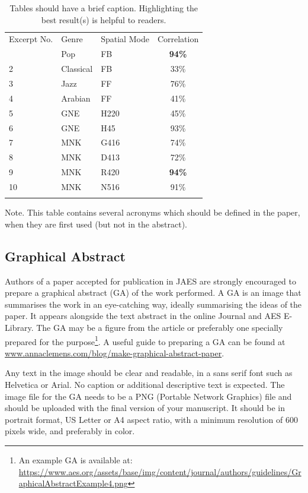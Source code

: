 \documentclass[fleqn]{jaes}
\begin{document}
\begin{table}[t]
\caption{Tables should have a brief caption. Highlighting the best result(s) is helpful to readers.}
\label{table:an_example_table}
{%
\begin{tabular}{@{}lllc@{}}\toprule
Excerpt No.& Genre & Spatial Mode & Correlation\\\colrule
 1 & Pop       & FB   & \textbf{94\%}\\
 2 & Classical & FB   & 33\%\\
 3 & Jazz      & FF   & 76\%\\
 4 & Arabian   & FF   & 41\%\\
 5 & GNE       & H220 & 45\%\\
 6 & GNE       & H45  & 93\%\\
 7 & MNK       & G416 & 74\%\\
 8 & MNK       & D413 & 72\%\\
 9 & MNK       & R420 & \textbf{94\%}\\
10 & MNK       & N516 & 91\%\\\botrule
\end{tabular}}
\begin{tabnote}
Note. This table contains several acronyms which should be defined in the paper, when they are first used (but not in the abstract).
\end{tabnote}
\end{table}

\subsection{Graphical Abstract}
Authors of a paper accepted for publication in JAES are strongly encouraged to prepare a graphical abstract (GA) of the work performed. A GA is an image that summarises the work in an eye-catching way, ideally summarising the ideas of the paper. It appears alongside the text abstract in the online Journal and AES E-Library. The GA may be a figure from the article or preferably one specially prepared for the purpose\footnote{An example GA is available at: \url{https://www.aes.org/assets/base/img/content/journal/authors/guidelines/GraphicalAbstractExample4.png}}. A useful guide to preparing a GA can be found at \url{www.annaclemens.com/blog/make-graphical-abstract-paper}. 

Any text in the image should be clear and readable, in a sans serif font such as Helvetica or Arial. No caption or additional descriptive text is expected. The image file for the GA needs to be a PNG (Portable Network Graphics) file and should be uploaded with the final version of your manuscript. It should be in portrait format, US Letter or A4 aspect ratio, with a minimum resolution of 600 pixels wide, and preferably in color.
\end{document}
